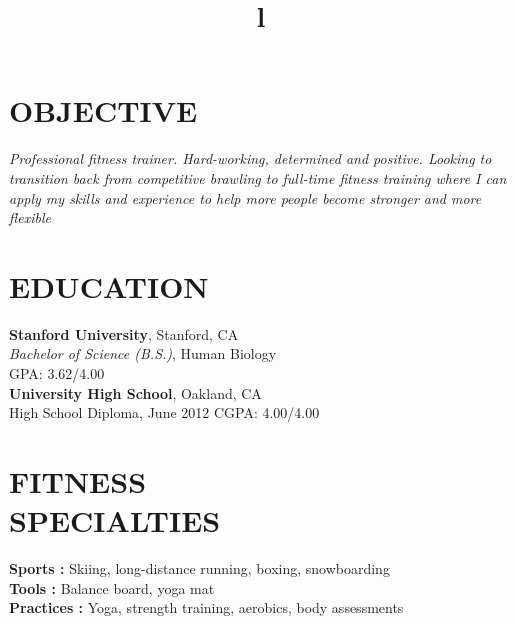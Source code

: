 \documentclass[margin]{res}
\begin{document}
\begin{resume}

\section{OBJECTIVE}
{\sl Professional fitness trainer. Hard-working, determined and positive. Looking to transition back from competitive brawling to full-time fitness training where I can apply my skills and experience to help more people become stronger and more flexible }

\section{EDUCATION}
\textbf{Stanford University}, Stanford, CA\\
{\sl Bachelor of Science (B.S.)}, Human Biology\\
\hfill GPA: 3.62/4.00\\
\textbf{University High School}, Oakland, CA \\
High School Diploma, June 2012
\hfill CGPA: 4.00/4.00



\section{FITNESS\\SPECIALTIES}

\textbf{Sports : } Skiing, long-distance running, boxing, snowboarding
\\
\textbf{Tools : } Balance board, yoga mat
\\
\textbf{Practices : } Yoga, strength training, aerobics, body assessments

\begin{format}
\title{l}\\
\\
\body\\
\end{format}


\end{resume}
\end{document}
